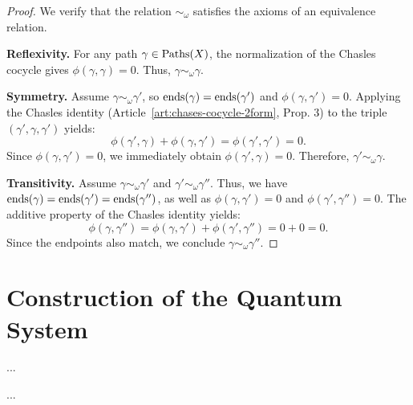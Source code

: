 \documentclass[10pt,reqno,letterpaper,twoside]{amsbook}
\begin{document}
  \begin{proof}
    We verify that the relation $\sim_\omega$ satisfies the axioms of an equivalence relation.
    
    \textbf{Reflexivity.}
    For any path $\gamma \in \operatorname{Paths}(X)$,
    the normalization of the Chasles cocycle gives $\phi(\gamma,\gamma) = 0$.
    Thus, $\gamma \sim_\omega \gamma$.
    
    \textbf{Symmetry.}
    Assume $\gamma \sim_\omega \gamma'$, so $\operatorname{ends}(\gamma) = \operatorname{ends}(\gamma')$ and $\phi(\gamma,\gamma') = 0$.
    Applying the Chasles identity (Article~\ref{art:chases-cocycle-2form}, Prop. 3) to the triple $(\gamma', \gamma, \gamma')$ yields:
    \[
      \phi(\gamma',\gamma) + \phi(\gamma,\gamma') = \phi(\gamma',\gamma') = 0.
      \]
    Since $\phi(\gamma,\gamma') = 0$, we immediately obtain $\phi(\gamma',\gamma) = 0$.
    Therefore, $\gamma' \sim_\omega \gamma$.
    
    \textbf{Transitivity.}
    Assume $\gamma \sim_\omega \gamma'$ and $\gamma' \sim_\omega \gamma''$.
    Thus, we have $\operatorname{ends}(\gamma) = \operatorname{ends}(\gamma') = \operatorname{ends}(\gamma'')$, as well as $\phi(\gamma,\gamma') = 0$ and $\phi(\gamma',\gamma'') = 0$.
    The additive property of the Chasles identity yields:
    \[
      \phi(\gamma,\gamma'') = \phi(\gamma,\gamma') + \phi(\gamma',\gamma'') = 0 + 0 = 0.
      \]
    Since the endpoints also match, we conclude $\gamma \sim_\omega \gamma''$.
  \end{proof}
  
  \section{Construction of the Quantum System}
  \label{sec:Construction of the Quantum System}
  
  \begin{article}
    \label{art:main-theorem-statement}
    ...
  \end{article}
  
  \begin{article}
    \label{art:groupoid-construction}
    ...
  \end{article}
  
\end{document}
